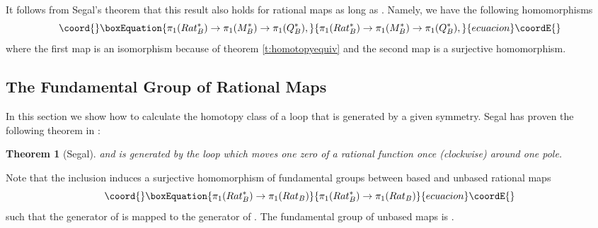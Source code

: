 \documentclass[a4paper,12pt]{article}
\newtheorem {theorem}{Theorem}[section]
\begin{document}
It follows from Segal's theorem that this result also 
holds for rational maps as long as \coordHE{}. Namely, we have the following 
homomorphisms
%
\begin{equation}\coord{}\boxEquation{
\label{epimorphism}
\pi_1(Rat_B^*) \to \pi_1(M_B^*) \to \pi_1(Q_B^*),
}{
\pi_1(Rat_B^*) \to \pi_1(M_B^*) \to \pi_1(Q_B^*),
}{ecuacion}\coordE{}\end{equation}
%
where the first map is an isomorphism because of theorem 
\ref{t:homotopyequiv} and the second map is a surjective homomorphism. \hfill 
\myHighlight{$\square$}\coordHE{}


\subsection{The Fundamental Group of Rational Maps}
\label{Fundamental}

In this section we show how to calculate the homotopy class of a loop
that is generated by a given symmetry.
%
Segal has proven the following theorem in \cite[Proposition 
6.4]{Segal:1979}:
%
\begin{theorem}[Segal]
\coordHE{} and is generated by the loop which moves one 
zero of a rational function once (clockwise) around one pole. \hfill 
\myHighlight{$\square$}\coordHE{}
\end{theorem}

Note that the inclusion induces a surjective homomorphism of fundamental 
groups between based and unbased rational maps
%
\begin{equation}\coord{}\boxEquation{
\pi_1(Rat^*_B) \to \pi_1(Rat_B)
}{
\pi_1(Rat^*_B) \to \pi_1(Rat_B)
}{ecuacion}\coordE{}\end{equation}
%
such that the generator of \coordHE{} is mapped to the generator of 
\coordHE{}. The fundamental group of unbased maps is \coordHE{} \cite{Epshtein:1973,Segal:1979}.
\end{document}
